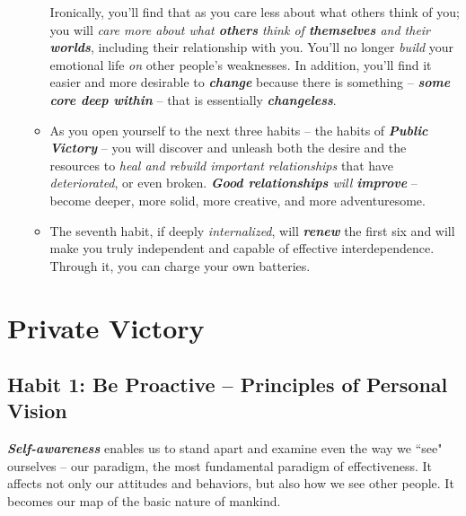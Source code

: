 \documentclass[11pt]{article}
\begin{document}
\begin{itemize}
\begin{itemize}
Ironically, you'll find that as you care less about what others think of you; you will \emph{care more about what \textbf{others} think of \textbf{themselves} and their \textbf{worlds}}, including their relationship with you. You'll no longer \emph{build} your emotional life \emph{on} other people's weaknesses. In addition, you'll find it easier and more desirable to \emph{\textbf{change}} because there is something -- \emph{\textbf{some core deep within}} -- that is essentially \emph{\textbf{changeless}}.

\item As you open yourself to the next three habits -- the habits of \emph{\textbf{Public Victory}} -- you will discover and unleash both the desire and the resources to \emph{heal and rebuild important relationships} that have \emph{deteriorated}, or even broken. \emph{\textbf{Good relationships} will \textbf{improve}} -- become deeper, more solid, more creative, and more adventuresome.

\item The seventh habit, if deeply \emph{internalized}, will \emph{\textbf{renew}} the first six and will make you truly independent and capable of effective interdependence. Through it, you can charge your own batteries.
\end{itemize}
\end{itemize}
\section{Private Victory}
\subsection{Habit 1: Be Proactive -- Principles of Personal Vision}
\emph{\textbf{Self-awareness}} enables us to stand apart and examine even the way we ``see" ourselves -- our paradigm, the most fundamental paradigm of effectiveness. It affects not only our attitudes and behaviors, but also how we see other people. It becomes our map of the basic nature of mankind.
\end{document}
